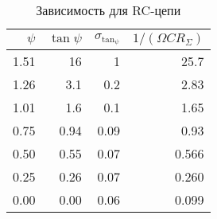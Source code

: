 \begin{table} 
 \caption{Зависимость для RC-цепи}
 \label{RCtable}
\begin{center}
\begin{tabular}{|*{4}{r|}}
\hline 
$\psi$ & $\tan \psi$ & $\sigma_{\tan_\psi}$ & $1 / (\Omega C R_\Sigma)$ \\ \hline 
 1.51 & 16   & 1    & 25.7  \\ \hline 
 1.26 & 3.1  & 0.2  & 2.83  \\ \hline 
 1.01 & 1.6  & 0.1  & 1.65  \\ \hline 
 0.75 & 0.94 & 0.09 & 0.93  \\ \hline 
 0.50 & 0.55 & 0.07 & 0.566 \\ \hline 
 0.25 & 0.26 & 0.07 & 0.260 \\ \hline 
 0.00 & 0.00 & 0.06 & 0.099 \\ \hline 
 \end{tabular}
\end{center} 
\end{table} 
